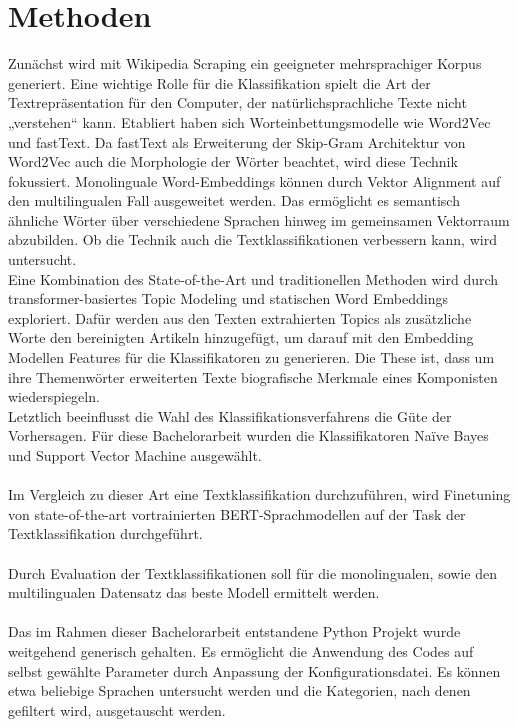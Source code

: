 \documentclass[ngerman]{ttlab-qualify}
\begin{document}
\section{Methoden}
Zunächst wird mit Wikipedia Scraping ein geeigneter mehrsprachiger Korpus generiert. Eine wichtige Rolle für die Klassifikation spielt die Art der Textrepräsentation für den Computer, der natürlichsprachliche Texte nicht „verstehen“ kann. Etabliert haben sich Worteinbettungsmodelle wie Word2Vec und fastText. Da fastText als Erweiterung der Skip-Gram Architektur von Word2Vec auch die Morphologie der Wörter beachtet, wird diese Technik fokussiert. Monolinguale Word-Embeddings können durch Vektor Alignment auf den multilingualen Fall ausgeweitet werden. Das ermöglicht es semantisch ähnliche Wörter über verschiedene Sprachen hinweg im gemeinsamen Vektorraum abzubilden. Ob die Technik auch die Textklassifikationen verbessern kann, wird untersucht.\\
Eine Kombination des State-of-the-Art und traditionellen Methoden wird durch transformer-basiertes Topic Modeling und statischen Word Embeddings exploriert. Dafür werden aus den Texten extrahierten Topics als zusätzliche Worte den bereinigten Artikeln hinzugefügt, um darauf mit den Embedding Modellen Features für die Klassifikatoren zu generieren. Die These ist, dass um ihre Themenwörter erweiterten Texte biografische Merkmale eines Komponisten wiederspiegeln.\\
Letztlich beeinflusst die Wahl des Klassifikationsverfahrens die Güte der Vorhersagen. Für diese Bachelorarbeit wurden die Klassifikatoren Naïve Bayes und Support Vector Machine ausgewählt.\\
\\
Im Vergleich zu dieser Art eine Textklassifikation durchzuführen, wird Finetuning von state-of-the-art vortrainierten BERT-Sprachmodellen auf der Task der Textklassifikation durchgeführt.\\
\\
Durch Evaluation der Textklassifikationen soll für die monolingualen, sowie den multilingualen Datensatz das beste Modell ermittelt werden.\\
\\
Das im Rahmen dieser Bachelorarbeit entstandene Python Projekt wurde weitgehend generisch gehalten. Es ermöglicht die Anwendung des Codes auf selbst gewählte Parameter durch Anpassung der Konfigurationsdatei. Es können etwa beliebige Sprachen untersucht werden und die Kategorien, nach denen gefiltert wird, ausgetauscht werden. 
\newpage
\end{document}
